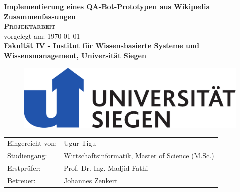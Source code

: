 \documentclass[
        ngerman,
        paper=a4,
        numbers=noendperiod,
]{scrreprt}
\begin{document}
\begin{titlepage}
    \begin{center}
    \huge \textbf{\textsf{Implementierung eines QA-Bot-Prototypen aus Wikipedia Zusammenfassungen}} \\
    \vspace{1cm}
    \LARGE\textbf{\textsc{Projektarbeit }}\\
    \vspace{1cm}
    \normalsize
    vorgelegt am: \today \\
    \vspace{2.5cm}
    \large \textbf{Fakultät IV - 
Institut für Wissensbasierte
Systeme und Wissensmanagement, Universität Siegen
}
\linebreak
\linebreak
\begin{figure}[H]
    \centering\includegraphics[width=0.4\linewidth]{images/imageuni.pdf}
    \label{fig:Unilabel}
\end{figure}
    \end{center}
    \vspace{3cm}
    \begin{center}
 \normalsize{
    \begin{tabular}{ll}
    	Eingereicht von: & {Ugur Tigu} \\
    	Studiengang: & Wirtschaftsinformatik, Master of Science (M.Sc.)\\
	Erstprüfer: & Prof. Dr.-Ing. Madjid Fathi \\
	Betreuer: &   Johannes Zenkert\\
    \end{tabular}\\
    }
\end{center}
\end{titlepage}
\setcounter{page}{0}
\tableofcontents
\clearpage 
{}
\listoffigures
\clearpage 
{}
\listoftables
\clearpage 
\end{document}
